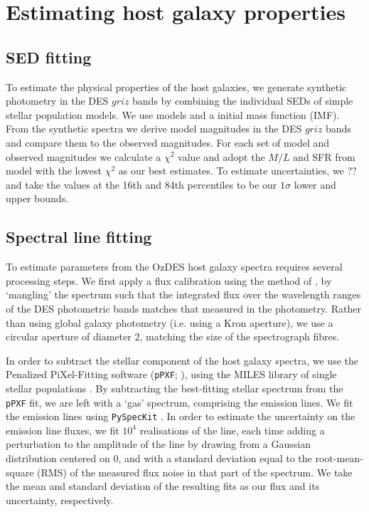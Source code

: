\documentclass[fleqn,usenatbib,]{mnras}
\begin{document}
\section{Estimating host galaxy properties \label{sec:measure}}

\subsection{SED fitting \label{subsec:sedfit}}

To estimate the physical properties of the host galaxies, we generate synthetic photometry in the DES $griz$ bands by combining the individual SEDs of simple stellar population models. We use \citet{Bruzual2003} models and a \citet{Chabrier2003} initial mass function (IMF). From the synthetic spectra we derive model magnitudes in the DES $griz$ bands and compare them to the observed magnitudes. For each set of model and observed magnitudes we calculate a $\chi^2$ value and adopt the $M/L$ and SFR from model with the lowest $\chi^2$ as our best estimates. To estimate uncertainties, we ?? and take the values at the 16th and 84th percentiles to be our $1\sigma$ lower and upper bounds.

\subsection{Spectral line fitting \label{subsec:linefit}}

To estimate parameters from the OzDES host galaxy spectra requires several processing steps. We first apply a flux calibration using the method of \citet{Swann2020}, by `mangling' the spectrum such that the integrated flux over the wavelength ranges of the DES photometric bands matches that measured in the photometry. Rather than using global galaxy photometry (i.e. using a Kron aperture), we use a circular aperture of diameter 2\arcsec, matching the size of the spectrograph fibres.  

In order to subtract the stellar component of the host galaxy spectra, we use the Penalized PiXel-Fitting software (\texttt{pPXF}; \citealt{Cappellari2004,Cappellari2012,Cappellari2017}), using the MILES library of single stellar populations \citep{Vazdekis2010}. By subtracting the best-fitting stellar spectrum from the \texttt{pPXF} fit, we are left with a `gas' spectrum, comprising the emission lines. We fit the emission lines using \texttt{PySpecKit} \citep{Ginsburg2011}. In order to estimate the uncertainty on the emission line fluxes, we fit $10^4$ realisations of the line, each time adding a perturbation to the amplitude of the line by drawing from a Gaussian distribution centered on 0, and with a standard deviation equal to the root-mean-square (RMS) of the measured flux noise in that part of the spectrum. We take the mean and standard deviation of the resulting fits as our flux and its uncertainty, respectively.
\end{document}
